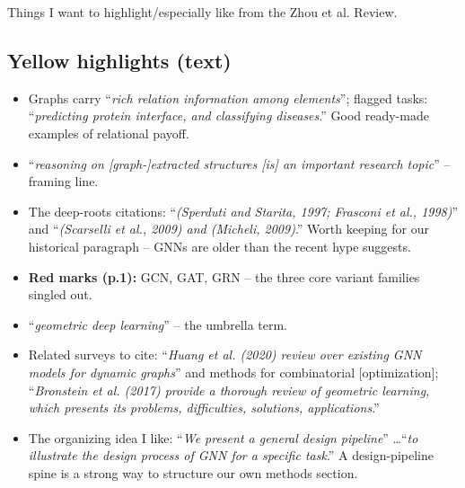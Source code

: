 Things I want to highlight/especially like from the Zhou et al. Review.


\subsection*{Yellow highlights (text)}

\begin{itemize}
    \item Graphs carry ``\emph{rich relation information among elements}'';
        flagged tasks: ``\emph{predicting protein interface, and classifying
        diseases}.'' Good ready-made examples of relational payoff.
    \item ``\emph{reasoning on [graph-]extracted structures [is] an important
        research topic}'' -- framing line.
    \item The deep-roots citations: ``\emph{(Sperduti and Starita, 1997;
        Frasconi et al., 1998)}'' and ``\emph{(Scarselli et al., 2009) and
        (Micheli, 2009)}.'' Worth keeping for our historical paragraph -- GNNs
        are older than the recent hype suggests.
    \item \textbf{Red marks (p.1):} GCN, GAT, GRN -- the three core variant
        families singled out.
\end{itemize}

\begin{itemize}
    \item ``\emph{geometric deep learning}'' -- the umbrella term.
    \item Related surveys to cite: ``\emph{Huang et al. (2020) review over
        existing GNN models for dynamic graphs}'' and methods for combinatorial
        [optimization]; ``\emph{Bronstein et al. (2017) provide a thorough
        review of geometric learning, which presents its problems, difficulties,
        solutions, applications}.''
    \item The organizing idea I like: ``\emph{We present a general design
        pipeline}'' \ldots ``\emph{to illustrate the design process of GNN for a
        specific task}.'' A design-pipeline spine is a strong way to structure
        our own methods section.
\end{itemize}

